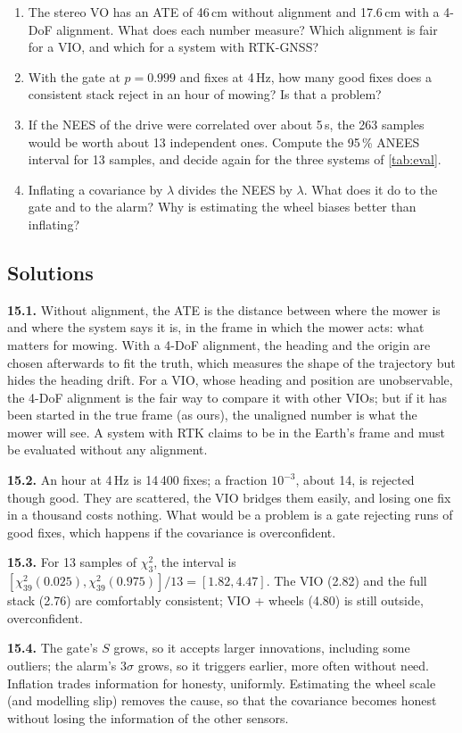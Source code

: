 \begin{enumerate}[label=\textbf{15.\arabic*},ref=15.\arabic*]
\item\label{ex:15align} The stereo VO has an ATE of 46\,cm without
  alignment and 17.6\,cm with a 4-DoF alignment. What does each number
  measure? Which alignment is fair for a VIO, and which for a system with
  RTK-GNSS?
\item\label{ex:15gate} With the gate at $p=0.999$ and fixes at 4\,Hz, how
  many good fixes does a consistent stack reject in an hour of mowing?
  Is that a problem?
\item\label{ex:15corr} If the NEES of the drive were
  correlated over about 5\,s, the 263 samples would be worth about 13
  independent ones. Compute the 95\,\% ANEES interval for 13 samples, and
  decide again for the three systems of \cref{tab:eval}.
\item\label{ex:15inflate} Inflating a covariance by $\lambda$ divides the
  NEES by $\lambda$. What does it do to the gate and to the alarm? Why is
  estimating the wheel biases better than inflating?
\end{enumerate}

\subsection*{Solutions}

\textbf{15.1.} Without alignment, the ATE is the distance between where
the mower is and where the system says it is, in the frame in which the
mower acts: what matters for mowing. With a 4-DoF alignment, the heading
and the origin are chosen afterwards to fit the truth, which measures
the shape of the trajectory but hides the heading drift. For a VIO,
whose heading and position are unobservable, the 4-DoF alignment is the
fair way to compare it with other VIOs; but if it has been started in
the true frame (as ours), the unaligned number is what the mower will
see. A system with RTK claims to be in the Earth's frame and must be
evaluated without any alignment.

\textbf{15.2.} An hour at 4\,Hz is 14\,400 fixes; a fraction $10^{-3}$, about
14, is rejected though good. They are scattered, the VIO bridges them
easily, and losing one fix in a thousand costs nothing. What would be a
problem is a gate rejecting runs of good fixes, which happens if the
covariance is overconfident.

\textbf{15.3.} For 13 samples of $\chi^2_3$, the interval is
$[\chi^2_{39}(0.025),\chi^2_{39}(0.975)]/13=[1.82,4.47]$. The VIO
(2.82) and the full stack (2.76) are comfortably consistent; VIO + wheels
(4.80) is still outside, overconfident.

\textbf{15.4.} The gate's $S$ grows, so it accepts larger innovations,
including some outliers; the alarm's $3\sigma$ grows, so it triggers
earlier, more often without need. Inflation trades information for
honesty, uniformly. Estimating the wheel scale (and modelling slip)
removes the cause, so that the covariance becomes honest without
losing the information of the other sensors.
